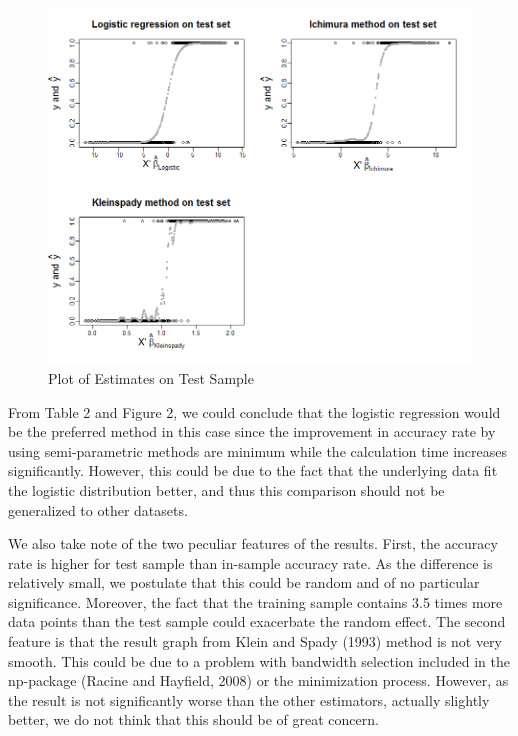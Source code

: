 \documentclass[a4paper]{article}
\begin{document}
\begin{figure}[H]

  \includegraphics[width=\linewidth]{figure2.png}
 
  \label{fig: Plot of estimates on test sample}
  \caption{Plot of Estimates on Test Sample}
\end{figure}

From Table 2 and Figure 2, we could conclude that the logistic regression would be the preferred method in this case since the improvement in accuracy rate by using semi-parametric methods are minimum while the calculation time increases significantly. However, this could be due to the fact that the underlying data fit the logistic distribution better, and thus this comparison should not be generalized to other datasets. 

We also take note of the two peculiar features of the results. First, the accuracy rate is higher for test sample than in-sample accuracy rate. As the difference is relatively small, we postulate that this could be random and of no particular significance. Moreover, the fact that the training sample contains 3.5 times more data points than the test sample could exacerbate the random effect. The second feature is that the result graph from Klein and Spady (1993) \cite{[12]} method is not very smooth. This could be due to a problem with bandwidth selection included in the np-package (Racine and Hayfield, 2008) \cite{[28]} or the minimization process. However, as the result is not significantly worse than the other estimators, actually slightly better, we do not think that this should be of great concern.
\end{document}
